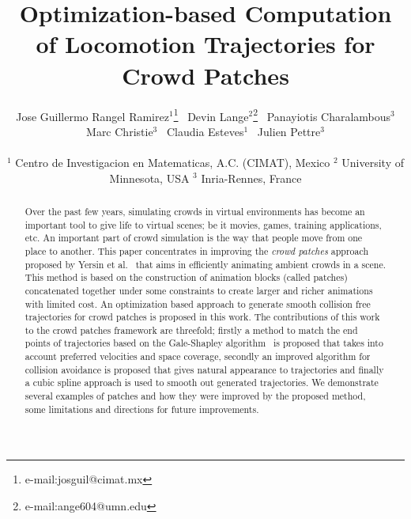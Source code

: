 \documentclass[conference]{acmsiggraph}
\title{Optimization-based Computation of Locomotion Trajectories for Crowd Patches}
\author{
	Jose Guillermo Rangel Ramirez{$^1$}\thanks{e-mail:josguil@cimat.mx}~
	Devin Lange{$^2$}\thanks{e-mail:ange604@umn.edu}~
	Panayiotis Charalambous{$^3$}\\
	Marc Christie{$^3$}~
	Claudia Esteves{$^1$}~
	Julien Pettre{$^3$}
	\\\\
	$^1$ Centro de Investigacion en Matematicas, A.C. (CIMAT), Mexico
	$^2$ University of Minnesota, USA
	$^3$ Inria-Rennes, France
}
\newcommand{\etal}{et al.\xspace}
\begin{document}

\maketitle

\begin{abstract}

Over the past few years, simulating crowds in virtual environments has become an important tool to give life to virtual scenes; be it movies, games, training applications, etc.
An important part of crowd simulation is the way that people
move from one place to another.
This paper concentrates in improving the \emph{crowd patches} approach proposed by Yersin \etal~\cite{Yersin:2009} that aims in efficiently animating ambient crowds in a scene.
This method is based on the construction of animation blocks (called patches) concatenated together under some constraints to create larger and richer animations with limited cost.
An optimization based approach to generate smooth collision free trajectories for crowd patches is proposed in this work.
The contributions of this work to the crowd patches framework are threefold; firstly a method to match the end points of trajectories based on the Gale-Shapley algorithm~\cite{gale1962college} is proposed that takes into account preferred velocities and space coverage, secondly an improved algorithm for collision avoidance is proposed that gives natural appearance to trajectories and finally a cubic spline approach is used to smooth out generated trajectories.
We demonstrate several examples of patches and how they were improved by the proposed method, some limitations and directions for future improvements.

\end{abstract}
\end{document}

